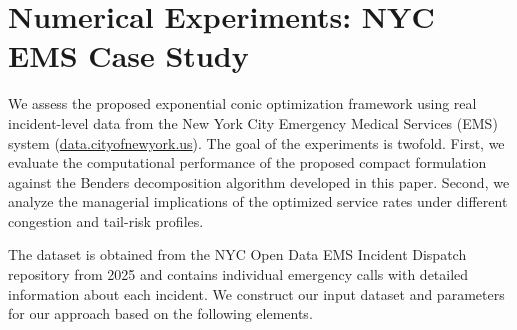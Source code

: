 \documentclass[letter,11pt, reqno]{amsart}
\begin{document}
 \section{Numerical Experiments: NYC EMS Case Study}
\label{sec:experiments}

We assess the proposed exponential conic optimization framework using real incident-level
data from the New York City Emergency Medical Services (EMS) system (\url{data.cityofnewyork.us}). The goal of the experiments
is twofold. First, we evaluate the computational performance of the proposed compact
formulation against the Benders decomposition algorithm developed in this paper.
Second, we analyze the managerial implications of the optimized service rates under
different congestion and tail-risk profiles.

The dataset is obtained from the NYC Open Data EMS Incident Dispatch repository from 2025 and
contains individual emergency calls with detailed information about each incident. We construct our input dataset and parameters for our approach based on the following elements.
\end{document}
